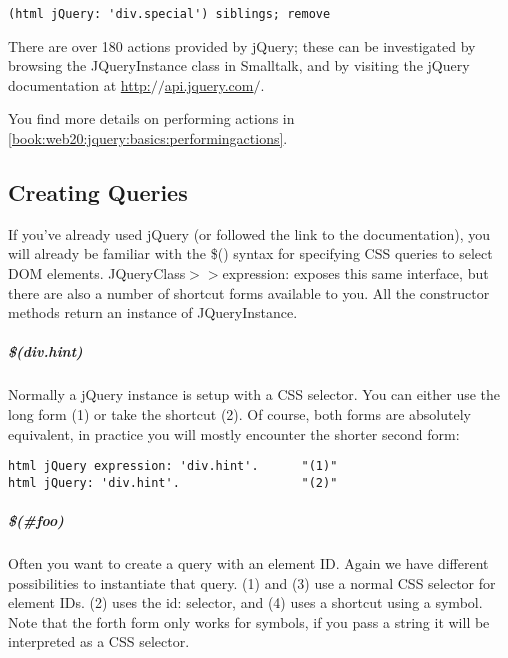 \documentclass[a4paper,10pt,twoside]{book}
\newcommand{\ct}[1]{{\small\ttfamily\textup{#1}}}
\begin{document}
\begin{lstlisting}
(html jQuery: 'div.special') siblings; remove
\end{lstlisting}

There are over 180 actions provided by jQuery; these can be investigated by browsing the \ct{JQueryInstance} class in Smalltalk, and by visiting the jQuery documentation at \href{http://api.jquery.com/}{http:$/$$/$api.jquery.com$/$}.

You find more details on performing actions in \autoref{book:web20:jquery:basics:performingactions}.

\subsection{Creating Queries}
\label{book:web20:jquery:basics:creatingqueries}

  If you've already used jQuery (or followed the link to the documentation), you will already be familiar with the \ct{\$()} syntax for specifying CSS queries to select DOM elements. \ct{JQueryClass$>$$>$expression:} exposes this same interface, but there are also a number of shortcut forms available to you. All the constructor methods return an instance of \ct{JQueryInstance}.

\subparagraph*{ \$(div.hint)}
\label{book:web20:jquery:basics:creatingqueries:89886656}
 Normally a jQuery instance is setup with a CSS selector. You can either use the long form (1) or take the shortcut (2). Of course, both forms are absolutely equivalent, in practice you will mostly encounter the shorter second form:

\begin{lstlisting}
html jQuery expression: 'div.hint'.      "(1)"
html jQuery: 'div.hint'.                 "(2)"
\end{lstlisting}

\subparagraph*{ \$(\#foo)}
\label{book:web20:jquery:basics:creatingqueries:206506055}
 Often you want to create a query with an element ID. Again we have different possibilities to instantiate that query. (1) and (3) use a normal CSS selector for element IDs. (2) uses the \ct{id:} selector, and (4) uses a shortcut using a symbol. Note that the forth form only works for symbols, if you pass a string it will be interpreted as a CSS selector.
\end{document}

